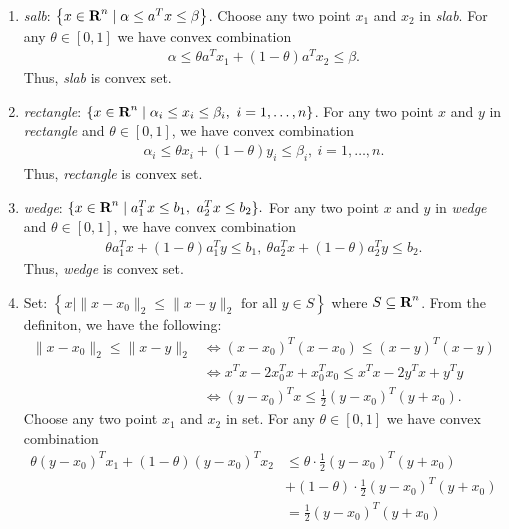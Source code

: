 \documentclass[12pt]{article}
\begin{document}
\begin{solution}[2.12(a)-(e)]
	\begin{enumerate}[label=(\alph*)]
		\item \textit{salb}: $\left\{ x\in{\mbox{\bf R}}^n \mid \alpha \le a^Tx\le \beta \right\} $.
			Choose any two point $x_1$ and $x_2$ in \textit{slab}.
			For any $\theta\in \left[ 0, 1 \right] $ we have convex combination
			\begin{align*}
				\alpha \le \theta a^Tx_1+(1-\theta)a^Tx_2\le \beta
			.\end{align*}
			Thus, \textit{slab} is convex set.
		\item \textit{rectangle}: $\left\{ x\in \reals^n \mid \alpha_i\le x_{i}\le \beta_{i},\ i=1,\ldots,n\right\} $.
			For any two point $x$ and $y$ in \textit{rectangle} and $\theta \in \left[ 0, 1 \right] $, we have convex combination
			\begin{align*}
				\alpha_i\le \theta x_{i}+(1-\theta)y_{i} \le \beta_{i},\ i=1,\ldots,n
			.\end{align*}
			Thus, \textit{rectangle} is convex set.
		\item \textit{wedge}: $\{x\in{{\mbox{\bf R}}}^{n}\mid a_{1}^{T}x\leq b_{1},\ a_{2}^{T}x\leq b_{2}\}.$
			For any two point $x$ and $y$ in \textit{wedge} and $\theta \in \left[ 0, 1 \right] $, we have convex combination
			\begin{align*}
				\theta a_1^Tx + (1-\theta)a_1^Ty\le b_1,\ \theta a_2^Tx + (1-\theta)a_2^Ty\le b_2
			.\end{align*}
			Thus, \textit{wedge} is convex set.
		\item Set: $\left\{ x \mid \|x-x_0\|_2 \le \|x-y\|_2 \text{ for all } y\in S \right\} $ where $S\subseteq {\mbox{\bf R}}^n$. From the definiton, we have the following:
			\begin{align*}
			\|x-x_0\|_2\le \|x-y\|_2 & \Longleftrightarrow (x-x_0)^T(x-x_0) \le (x-y)^T(x-y) \\
															 &\Longleftrightarrow x^Tx-2x_0^Tx+x_0^Tx_0\le x^Tx-2y^Tx+y^Ty\\
															 &\Longleftrightarrow (y-x_0)^Tx \le \frac{1}{2}(y-x_0)^T(y+x_0)
			.\end{align*}
			Choose any two point $x_1$ and $x_2$ in set.
			For any $\theta\in \left[ 0, 1 \right] $ we have convex combination
			\begin{align*}
				\theta(y-x_0)^Tx_1 + (1-\theta)(y-x_0)^Tx_2 &\le \theta \cdot \frac{1}{2}(y-x_0)^T(y+x_0)\\ &+ (1-\theta) \cdot \frac{1}{2}(y-x_0)^T(y+x_0) \\&= \frac{1}{2}(y-x_0)^T(y+x_0)

\end{align*}
\end{enumerate}
\end{solution}
\end{document}
